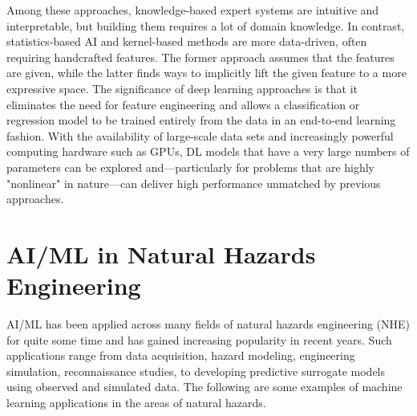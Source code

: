 Among these approaches, knowledge-based expert systems are intuitive and interpretable, but building them requires a lot of domain knowledge. In contrast, statistics-based AI and kernel-based methods are more data-driven, often requiring handcrafted features. The former approach assumes that the features are given, while the latter finds ways to implicitly lift the given feature to a more expressive space. The significance of deep learning approaches is that it eliminates the need for feature engineering and allows a classification or regression model to be trained entirely from the data in an end-to-end learning fashion. With the availability of large-scale data sets and increasingly powerful computing hardware such as GPUs, DL models that have a very large numbers of parameters can be explored and—particularly for problems that are highly "nonlinear" in nature—can deliver high performance unmatched by previous approaches.

\section{AI/ML in Natural Hazards Engineering}
\label{sec:ai_nathaz}

AI/ML has been applied across many fields of natural hazards engineering (NHE) for quite some time and has gained increasing popularity in recent years. Such applications range from data acquisition, hazard modeling, engineering simulation, reconnaissance studies, to developing predictive surrogate models using observed and simulated data. The following are some examples of machine learning applications in the areas of natural hazards.

